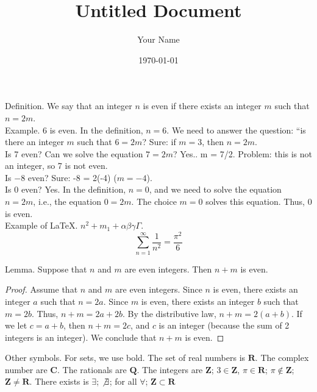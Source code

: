\documentclass[12pt]{article}
\title{Untitled Document}
\author{Your Name}
\date{\today}
\begin{document}
\maketitle

Definition. We say that an integer $n$ is even if there exists an integer $m$ such that $n = 2m$.
\\

Example. $6$ is even. In the definition, $n = 6$. We need to answer the question: ``is there an integer $m$ such that $6 = 2m$? Sure: if $m = 3$, then $n = 2m$.
\\

Is 7 even? Can we solve the equation $7 = 2m$? Yes.. m = 7/2. Problem: this is not an integer, so 7 is not even.
\\

Is $-8$ even? Sure: -8 = 2(-4) ($m = -4$). 
\\

Is 0 even? Yes. In the definition, $n = 0$, and we need to solve the equation $n = 2m$, i.e., the equation $0 = 2m$. The choice $m = 0$ solves this equation. Thus, $0$ is even. 
\\


Example of LaTeX. $n^2 + m_1 + \alpha \beta\gamma \Gamma$.
\[
\sum_{n = 1}^{\infty} \frac{1}{n^2} = \frac{\pi^2}{6}
\]

\newpage

Lemma. Suppose that $n$ and $m$ are even integers. Then $n + m$ is even.
\\

\begin{proof}
  Assume that $n$ and $m$ are even integers. %
  Since $n$ is even, there exists an integer $a$ such that $n = 2a$.
  Since $m$ is even, there exists an integer $b$ such that $m = 2b$.
  Thus, $n + m = 2a + 2b$. By the distributive law, $n + m = 2(a + b)$. If we let $c = a + b$, then $n + m = 2c$, and $c$ is an integer (because the sum of 2 integers is an integer). We conclude that $n + m$ is even.
  

  
\end{proof}



Other symbols. For sets, we use bold. The set of real numbers is $\mathbf{R}$. The complex number are $\mathbf{C}$. The rationals are $\mathbf{Q}$. The integers are $\mathbf{Z}$; $3 \in \mathbf{Z}$, $\pi \in \mathbf{R}$; $\pi \not \in \mathbf{Z}$; $\mathbf{Z} \not = \mathbf{R}$. There exists is $\exists$; $\not \exists$; for all $\forall$; $\mathbf{Z} \subset \mathbf{R}$
\end{document}
